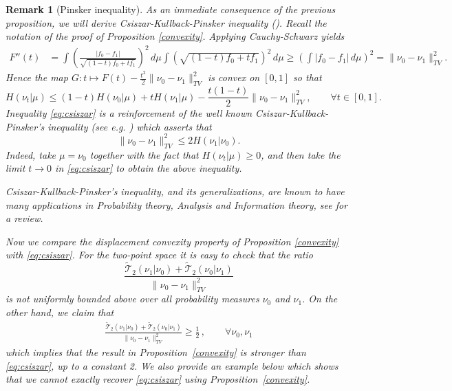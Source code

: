 \documentclass[11pt]{amsart}
\newtheorem{rem}[equation]{Remark}
\numberwithin{equation}{section}
\begin{document}
\begin{rem}[Pinsker inequality]
As an immediate consequence of the previous proposition, we will derive Csiszar-Kullback-Pinsker inequality (\cite{pinsker,kullback,csiszar}).
Recall the notation of the proof of Proposition \ref{convexity}.
Applying Cauchy-Schwarz yields
\begin{align*}
F''(t)&=\int \left(\frac{|f_0-f_1|}{\sqrt{(1-t)f_0+tf_1}}\right)^2\,d\mu\int \left(\sqrt{(1-t)f_0+tf_1}\right)^2\,d\mu
\geq \left(\int |f_0-f_1|\,d\mu\right)^2
=\|\nu_0-\nu_1\|_{TV}^2.
\end{align*}
Hence the map $G:t\mapsto F(t)-\frac{t^2}{2}\|\nu_0-\nu_1\|_{TV}^2$ is convex on $[0,1]$ so that
\begin{equation} \label{eq:csiszar}
H(\nu_t|\mu)\leq (1-t)H(\nu_0|\mu)+tH(\nu_1|\mu)-\frac{t(1-t)}{2}\|\nu_0-\nu_1\|_{TV}^2,\qquad \forall t\in [0,1] .
\end{equation}
Inequality \eqref{eq:csiszar} is a reinforcement of the well known Csiszar-Kullback-Pinsker's inequality (see e.g. \cite[Theorem 8.2.7]{ane}) which asserts that 
$$
\|\nu_0-\nu_1\|_{TV}^2 \leq 2 H(\nu_1|\nu_0) .
$$
Indeed, take $\mu=\nu_0$ together with the fact that $H(\nu_t|\mu) \geq 0$, and then take the limit $t \to 0$ in \eqref{eq:csiszar} to obtain the above inequality.

Csiszar-Kullback-Pinsker's inequality, and its generalizations, are known to have many applications in Probability theory, Analysis and Information theory, see \cite[Page 636]{villani} for a review.

Now we compare the displacement convexity property of Proposition \ref{convexity} with \eqref{eq:csiszar}. For the two-point space it is easy to check that  the ratio 
$$
\frac{{\widetilde{\mathcal{T}}}_2(\nu_1|\nu_0)+{\widetilde{\mathcal{T}}}_2(\nu_0|\nu_1)}{\|\nu_0-\nu_1\|_{TV}^2}
$$
is not uniformly bounded above over all probability measures $\nu_0$ and $\nu_1$. On the other hand, we claim that
\begin{eqnarray}\label{bonrepas}
\frac{{\widetilde{\mathcal{T}}}_2(\nu_1|\nu_0)+{\widetilde{\mathcal{T}}}_2(\nu_0|\nu_1)}{\|\nu_0-\nu_1\|_{TV}^2}  \geq \frac{1}{2}\,, \qquad \forall \nu_0, \nu_1
\end{eqnarray}
which implies that the result in Proposition~\ref{convexity} is 
stronger than \eqref{eq:csiszar}, up to a constant 2. 
We also provide an example below which shows that  we cannot exactly recover \eqref{eq:csiszar} using Proposition~\ref{convexity}.


\end{rem}
\end{document}
